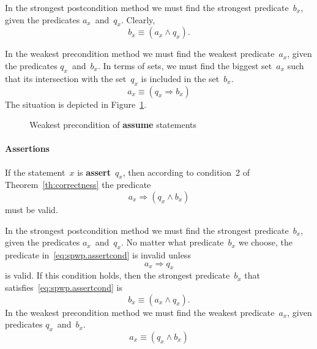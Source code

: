 \documentclass[a4paper]{article}
\newcommand{\limp}{\Rightarrow}
\theoremstyle{slanted}
\theoremstyle{definition}
\theoremstyle{remark}
\begin{document}
In the strongest postcondition method we must find the strongest
predicate~$b_x$, given the predicates $a_x$~and~$q_x$. Clearly,
\begin{equation}
b_x \equiv (a_x\land q_x).
\end{equation}

In the weakest precondition method we must find the weakest
predicate~$a_x$, given the predicates $q_x$~and~$b_x$. In terms
of sets, we must find the biggest set~$a_x$ such that its
intersection with the set~$q_x$ is included in the set~$b_x$.
\begin{equation}
a_x \equiv (q_x \limp b_x)
\end{equation}
The situation is depicted in Figure~\ref{fig:wp.assume}.

\begin{figure}\centering
{}
\caption{Weakest precondition of \textbf{assume} statements}
\label{fig:wp.assume}
\end{figure}

\paragraph{Assertions} If the statement~$x$ is
\textbf{assert}~$q_x$, then according to condition~2 of
Theorem~\ref{th:correctness} the predicate
\begin{equation}
a_x \limp (q_x \land b_x)
\label{eq:spwp.assertcond}
\end{equation}
must be valid.

In the strongest postcondition method we must find the strongest
predicate~$b_x$, given the predicates $a_x$~and~$q_x$. No matter
what predicate~$b_x$ we choose, the predicate in~\eqref{eq:spwp.assertcond}
is invalid unless
\begin{equation}
a_x \limp q_x
\end{equation}
is valid. If this condition holds, then the strongest
predicate~$b_x$ that satisfies~\eqref{eq:spwp.assertcond} is
\begin{equation}
b_x \equiv (a_x \land q_x).
\end{equation}
In the weakest precondition method we must find the weakest
predicate~$a_x$, given predicates $q_x$~and~$b_x$. 
\begin{equation}
a_x \equiv (q_x \land b_x)
\end{equation}
\end{document}
